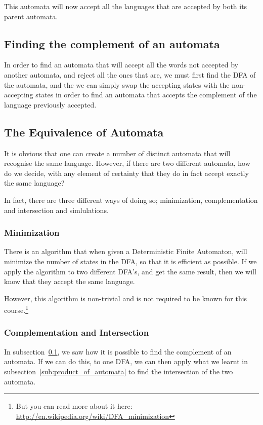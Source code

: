 This automata will now accept all the languages that are accepted by both its
parent automata.

\subsection{Finding the complement of an automata}
\label{sub:complement_of_automata}

In order to find an automata that will accept all the words not accepted by
another automata, and reject all the ones that are, we must first find the DFA
of the automata, and the we can simply swap the accepting states with the non-
accepting states in order to find an automata that accepts the complement of the
language previously accepted.

\subsection{The Equivalence of Automata}

It is obvious that one can create a number of distinct automata that will
recognise the same language. However, if there are two different automata, how
do we decide, with any element of certainty that they do in fact accept exactly
the same language?

In fact, there are three different ways of doing so; minimization,
complementation and intersection and simlulations.

\subsubsection{Minimization}

There is an algorithm that when given a Deterministic Finite Automaton, will
minimize the number of states in the DFA, so that it is efficient as possible. If
we apply the algorithm to two different DFA's, and get the same result, then we
will know that they accept the same language.

However, this algorithm is non-trivial and is not required to be known for this
course.\footnote{But you can read more about it here:
\url{http://en.wikipedia.org/wiki/DFA_minimization}}

\subsubsection{Complementation and Intersection}

In subsection~\ref{sub:complement_of_automata}, we saw how it is possible to
find the complement of an automata. If we can do this, to one DFA, we can then
apply what we learnt in subsection~\ref{sub:product_of_automata} to find the
intersection of the two automata.

